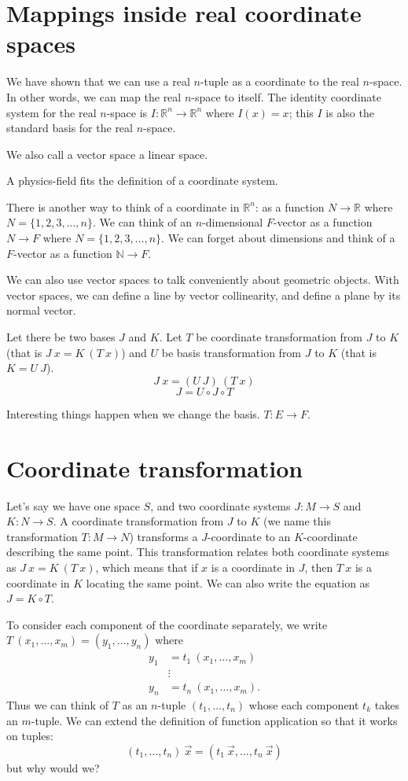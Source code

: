 \section{Mappings inside real coordinate spaces}

We have shown that we can use a real $n$-tuple as a coordinate to the real $n$-space.
In other words, we can map the real $n$-space to itself.
The identity coordinate system for the real $n$-space is
$I : \mathbb{R}^n \to \mathbb{R}^n$ where $I(x) = x$;
this $I$ is also the standard basis for the real $n$-space.

We also call a vector space a linear space.

A physics-field fits the definition of a coordinate system.

There is another way to think of a coordinate in $\mathbb{R}^n$:
as a function $N \to \mathbb{R}$ where $N = \{1,2,3,\ldots,n\}$.
We can think of an $n$-dimensional $F$-vector as a function $N \to F$ where $N = \{1,2,3,\ldots,n\}$.
We can forget about dimensions and think of a $F$-vector as a function $\mathbb{N} \to F$.

We can also use vector spaces to talk conveniently about geometric objects.
With vector spaces, we can define a line by vector collinearity,
and define a plane by its normal vector.

Let there be two bases $J$ and $K$.
Let $T$ be coordinate transformation from $J$ to $K$
(that is $J~x = K~(T~x)$)
and $U$ be basis transformation from $J$ to $K$
(that is $K = U~J$).
\[
J~x = (U~J)~(T~x)
\]
\[
J = U \circ J \circ T
\]

Interesting things happen when we change the basis.
$T : E \to F$.

\section{Coordinate transformation}

Let's say we have one space $S$,
and two coordinate systems $J : M \to S$ and $K : N \to S$.
A coordinate transformation from $J$ to $K$ (we name this transformation $T : M \to N$)
transforms a $J$-coordinate
to an $K$-coordinate describing the same point.
This transformation relates both coordinate systems as
$J~x = K~(T~x)$, which means that if $x$ is a coordinate in $J$, then $T~x$ is a coordinate in $K$ locating the same point.
We can also write the equation as $J = K \circ T$.

To consider each component of the coordinate separately,
we write
$T~(x_1,\ldots,x_m) = (y_1,\ldots,y_n)$
where
\begin{align*}
y_1 &= t_1~(x_1,\ldots,x_m)
\\ &\vdots
\\ y_n &= t_n~(x_1,\ldots,x_m).
\end{align*}
Thus we can think of $T$ as an $n$-tuple $(t_1,\ldots,t_n)$
whose each component $t_k$ takes an $m$-tuple.
We can extend the definition of function application so that it works on tuples:
\[
(t_1,\ldots,t_n)~\vec{x} = (t_1~\vec{x}, \ldots, t_n~\vec{x})
\]
but why would we?

